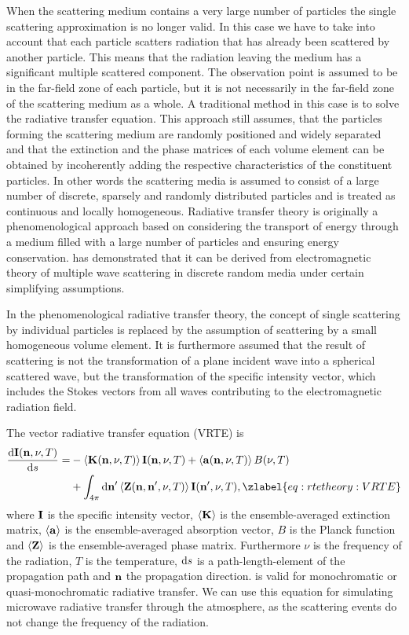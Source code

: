 When the scattering medium contains a very large number of particles
the single scattering approximation is no longer valid. In this case
we have to take into account that each particle scatters radiation
that has already been scattered by another particle. This means that
the radiation leaving the medium has a significant multiple scattered
component. The observation point is assumed to be in the far-field
zone of each particle, but it is not necessarily in the far-field zone
of the scattering medium as a whole. A traditional method in this case
is to solve the radiative transfer equation.  This approach still
assumes, that the particles forming the scattering medium are randomly
positioned and widely separated and that the extinction and the phase
matrices of each volume element can be obtained by incoherently adding
the respective characteristics of the constituent particles. In other
words the scattering media is assumed to consist of a large number of
discrete, sparsely and randomly distributed particles and is treated
as continuous and locally homogeneous.  Radiative transfer theory is
originally a phenomenological approach based on considering the
transport of energy through a medium filled with a large number of
particles and ensuring energy conservation.
\citet{mishchenko02:_vector} has demonstrated that it can be derived
from electromagnetic theory of multiple wave scattering in discrete
random media under certain simplifying assumptions.

In the phenomenological radiative transfer theory, the concept of
single scattering by individual particles is replaced by the
assumption of scattering by a small homogeneous volume element. It is
furthermore assumed that the result of scattering is not the
transformation of a plane incident wave into a spherical scattered
wave, but the transformation of the specific intensity vector, which
includes the Stokes vectors from all waves contributing to the
electromagnetic radiation field.

The vector radiative transfer equation (VRTE) is
\begin{eqnarray}
  \frac {\DiffD\StoVec(\PDir, \nu, T)}{\DiffD s} =
    &{}-\EnsAvr{\ExtMat(\PDir, \nu, T)} \StoVec(\PDir, \nu, T) +
    \EnsAvr{\AbsVec(\PDir, \nu, T)} \rlap{$B(\nu, T)$} \nonumber \\
    &{}+ \int_{4\pi} \DiffD\PDir' \EnsAvr{\PhaMat(\PDir, \PDir', \nu, T)} \StoVec(\PDir', \nu, T),
  \zlabel{eq:rtetheory:VRTE}
  \end{eqnarray}
where ${\bf I}$ is the specific intensity vector, $\left\langle {\bf K} \right\rangle$ is the ensemble-averaged extinction matrix, $\left\langle {\bf a} \right\rangle$ is the ensemble-averaged absorption vector, $B$ is the
Planck function and $\left\langle {\bf Z} \right\rangle$ is the ensemble-averaged
phase matrix.  Furthermore $\nu$ is the frequency of the radiation,
$T$ is the temperature, $\mathrm{d} s$ is a path-length-element of the
propagation path and ${\bf n}$ the propagation direction.
 is valid for monochromatic or quasi-monochromatic
radiative transfer. We can use this equation for simulating microwave
radiative transfer through the atmosphere, as the scattering events do
not change the frequency of the radiation.

